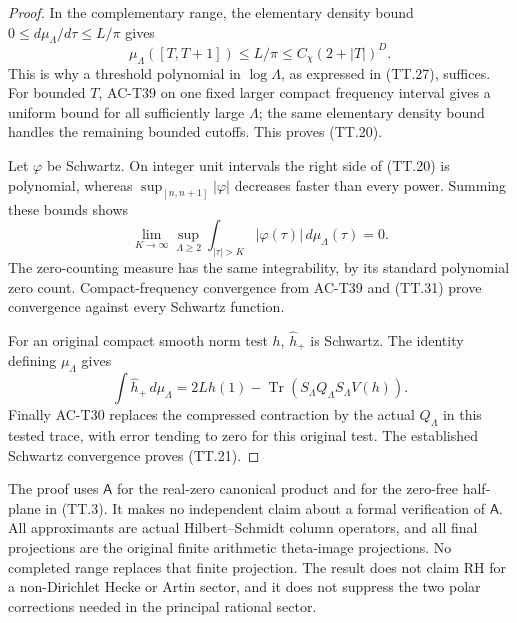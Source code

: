 \begin{proof}
In the complementary range, the elementary density
bound \(0\leq d\mu_\Lambda/d\tau\leq L/\pi\) gives
\[
       \mu_\Lambda([T,T+1])
                       \leq L/\pi
                       \leq C_\chi(2+|T|)^D.
 \tag{TT.30}
\]
This is why a threshold polynomial in \(\log\Lambda\),
as expressed in (TT.27), suffices.
For bounded \(T\), AC-T39 on one fixed larger compact
frequency interval gives a uniform bound for all
sufficiently large \(\Lambda\); the same elementary
density bound handles the remaining bounded cutoffs.
This proves (TT.20).

Let \(\varphi\) be Schwartz.  On integer unit intervals
the right side of (TT.20) is polynomial, whereas
\(\sup_{[n,n+1]}|\varphi|\) decreases faster than every
power.  Summing these bounds shows
\[
 \lim_{K\to\infty}\sup_{\Lambda\geq2}
             \int_{|\tau|>K}|\varphi(\tau)|\,d\mu_\Lambda(\tau)=0.
 \tag{TT.31}
\]
The zero-counting measure has the same integrability,
by its standard polynomial zero count.
Compact-frequency convergence from AC-T39 and
(TT.31) prove convergence against every Schwartz
function.

For an original compact smooth norm test \(h\),
\(\widehat h_+\) is Schwartz.
The identity defining \(\mu_\Lambda\) gives
\[
 \int\widehat h_+\,d\mu_\Lambda
       =2Lh(1)-
             \operatorname{Tr}(S_\Lambda Q_\Lambda
                                     S_\Lambda V(h)).
 \]
Finally AC-T30 replaces the compressed contraction
by the actual \(Q_\Lambda\) in this tested trace,
with error tending to zero for this original test.
The established Schwartz convergence proves (TT.21).
\end{proof}

\begin{remark}
The proof uses \(\mathsf A\) for the real-zero canonical
product and for the zero-free half-plane in (TT.3).
It makes no independent claim about a formal verification
of \(\mathsf A\).
All approximants are actual Hilbert--Schmidt column
operators, and all final projections are the original
finite arithmetic theta-image projections.
No completed range replaces that finite projection.
The result does not claim RH for a non-Dirichlet Hecke
or Artin sector, and it does not suppress the two polar
corrections needed in the principal rational sector.
\end{remark}
